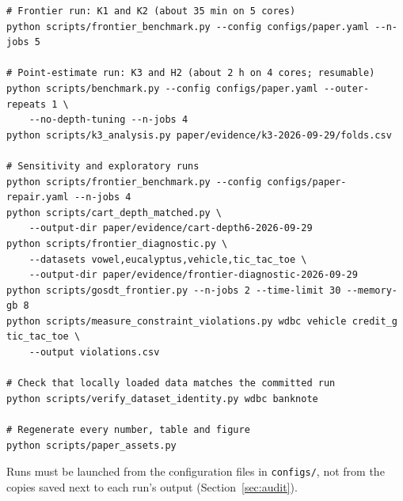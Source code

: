 \documentclass[11pt]{article}
\begin{document}
\begin{small}
\begin{verbatim}
# Frontier run: K1 and K2 (about 35 min on 5 cores)
python scripts/frontier_benchmark.py --config configs/paper.yaml --n-jobs 5

# Point-estimate run: K3 and H2 (about 2 h on 4 cores; resumable)
python scripts/benchmark.py --config configs/paper.yaml --outer-repeats 1 \
    --no-depth-tuning --n-jobs 4
python scripts/k3_analysis.py paper/evidence/k3-2026-09-29/folds.csv

# Sensitivity and exploratory runs
python scripts/frontier_benchmark.py --config configs/paper-repair.yaml --n-jobs 4
python scripts/cart_depth_matched.py \
    --output-dir paper/evidence/cart-depth6-2026-09-29
python scripts/frontier_diagnostic.py \
    --datasets vowel,eucalyptus,vehicle,tic_tac_toe \
    --output-dir paper/evidence/frontier-diagnostic-2026-09-29
python scripts/gosdt_frontier.py --n-jobs 2 --time-limit 30 --memory-gb 8
python scripts/measure_constraint_violations.py wdbc vehicle credit_g tic_tac_toe \
    --output violations.csv

# Check that locally loaded data matches the committed run
python scripts/verify_dataset_identity.py wdbc banknote

# Regenerate every number, table and figure
python scripts/paper_assets.py
\end{verbatim}
\end{small}

Runs must be launched from the configuration files in \texttt{configs/}, not from the
copies saved next to each run's output (Section~\ref{sec:audit}).
\end{document}
